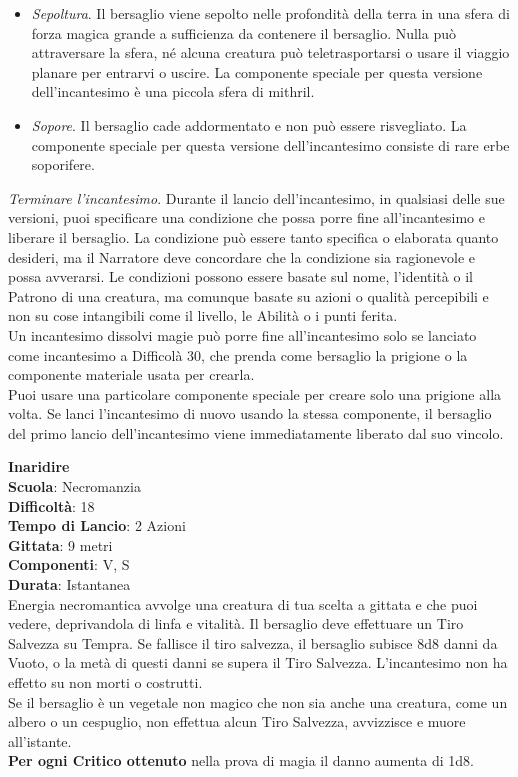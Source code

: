 \begin{multicols}{2}
\begin{itemize}
\item
\textit{Sepoltura}. Il bersaglio viene sepolto nelle profondità della terra in una sfera di forza magica grande a sufficienza da contenere il bersaglio. Nulla può attraversare la sfera, né alcuna creatura può teletrasportarsi o usare il viaggio planare per entrarvi o uscire. La componente speciale per questa versione dell'incantesimo è una piccola sfera di mithril. 
\item
\textit{Sopore}. Il bersaglio cade addormentato e non può essere risvegliato. La componente speciale per questa versione dell'incantesimo consiste di rare erbe soporifere.
\end{itemize}
\medskip
\textit{Terminare l'incantesimo}. Durante il lancio dell'incantesimo, in qualsiasi delle sue versioni, puoi specificare una condizione che possa porre fine all'incantesimo e liberare il bersaglio. La condizione può essere tanto specifica o elaborata quanto desideri, ma il Narratore deve concordare che la condizione sia ragionevole e possa avverarsi. Le condizioni possono essere basate sul nome, l'identità o il Patrono di una creatura, ma comunque basate su azioni o qualità percepibili e non su cose intangibili come il livello, le Abilità o i punti ferita.\\
Un incantesimo dissolvi magie può porre fine all'incantesimo solo se lanciato come incantesimo a Difficolà 30, che prenda come bersaglio la prigione o la componente materiale usata per crearla.\\
Puoi usare una particolare componente speciale per creare solo una prigione alla volta. Se lanci l'incantesimo di nuovo usando la stessa componente, il bersaglio del primo lancio dell'incantesimo viene immediatamente liberato dal suo vincolo.

\medskip\textbf{Inaridire}\\
\textbf{Scuola}: Necromanzia\\
\textbf{Difficoltà}: 18\\
\textbf{Tempo di Lancio}: 2 Azioni\\
\textbf{Gittata}: 9 metri\\
\textbf{Componenti}: V, S\\
\textbf{Durata}: Istantanea\\
Energia necromantica avvolge una creatura di tua scelta a gittata e che puoi vedere, deprivandola di linfa e vitalità. Il bersaglio deve effettuare un Tiro Salvezza su Tempra. Se fallisce il tiro salvezza, il bersaglio subisce 8d8 danni da Vuoto, o la metà di questi danni se supera il Tiro Salvezza. L'incantesimo non ha effetto su non morti o costrutti.\\
Se il bersaglio è un vegetale non magico che non sia anche una creatura, come un albero o un cespuglio, non effettua alcun Tiro Salvezza, avvizzisce e muore all'istante.\\
\textbf{Per ogni Critico ottenuto} nella prova di magia il danno aumenta di 1d8.


\end{multicols}

